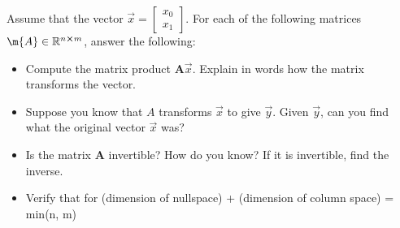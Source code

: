 


Assume that the vector $\vec{x} = \begin{bmatrix}x_0 \\ x_1\end{bmatrix}$. For each of the following matrices $\m{A} \in \mathbb{R}^{n \cross m}$, answer the following:
\begin{itemize}
    \item Compute the matrix product $\mathbf{A}\vec{x}$. Explain in words how the matrix transforms the vector.
    \item Suppose you know that $A$ transforms $\vec{x}$ to give $\vec{y}$. Given $\vec{y}$, can you find what the original vector $\vec{x}$ was?
    \item Is the matrix $\mathbf{A}$ invertible? How do you know? If it is invertible, find the inverse.
    \item Verify that for (dimension of nullspace) + (dimension of column space) = min(n, m)
\end{itemize}
